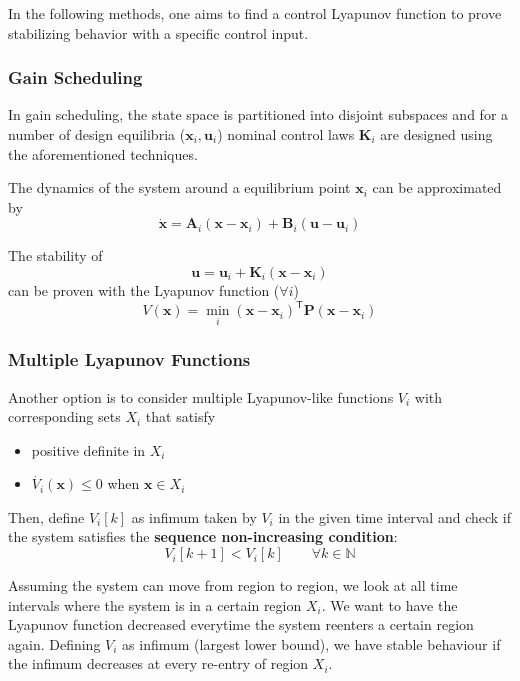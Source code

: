 In the following methods, one aims to find a control Lyapunov function to prove stabilizing behavior with a specific control input.

\subsubsection{Gain Scheduling}
In gain scheduling, the state space is partitioned into disjoint subspaces and for a number of design equilibria ($\mathbf{x}_i, \mathbf{u}_i$)  nominal control laws $\mathbf{K}_i$ are designed using the aforementioned techniques.

\newpar{}
The dynamics of the system around a equilibrium point $\mathbf{x}_i$ can be approximated by
\noindent\begin{equation*}
    \dot{\mathbf{x}} = \mathbf{A}_i(\mathbf{x}-\mathbf{x}_i) + \mathbf{B}_i(\mathbf{u}-\mathbf{u}_i)
\end{equation*}

The stability of
\noindent\begin{equation*}
    \mathbf{u} = \mathbf{u}_i+\mathbf{K}_i(\mathbf{x}-\mathbf{x}_i)
\end{equation*}
can be proven with the Lyapunov function ($\forall i$)
\noindent\begin{equation*}
    V(\mathbf{x}) = \min_{i} {(\mathbf{x}-\mathbf{x}_i)}^{\mathsf{T}}\mathbf{P}(\mathbf{x}-\mathbf{x}_i)
\end{equation*}

\subsubsection{Multiple Lyapunov Functions}
Another option is to consider multiple Lyapunov-like functions $V_i$ with corresponding sets $X_i$ that satisfy
\begin{itemize}
    \item positive definite in $X_i$
    \item $\dot{V_i}(\mathbf{x})\leq 0$ when $\mathbf{x}\in X_i$
\end{itemize}
Then, define $V_i[k]$ as infimum taken by $V_i$ in the given time interval and check if the system satisfies the \textbf{sequence non-increasing condition}:
\noindent\begin{equation*}
    V_i[k+1] < V_i[k] \qquad \forall k \in \mathbb{N}
\end{equation*}

\newpar{}

Assuming the system can move from region to region, we look at all time intervals where the system is in a certain region $X_i$. We want to have the Lyapunov function decreased everytime the system reenters a certain region again. Defining $V_i$ as infimum (largest lower bound), we have stable behaviour if the infimum decreases at every re-entry of region $X_i$.

